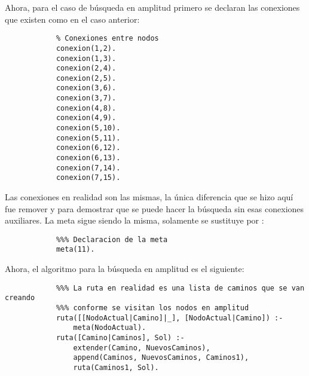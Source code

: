 \begin{solution}
        Ahora, para el caso de búsqueda en amplitud primero se declaran las conexiones que existen como en el caso anterior:
        \begin{verbatim}
            % Conexiones entre nodos
            conexion(1,2).
            conexion(1,3).
            conexion(2,4).
            conexion(2,5).
            conexion(3,6).
            conexion(3,7).
            conexion(4,8).
            conexion(4,9).
            conexion(5,10).
            conexion(5,11).
            conexion(6,12).
            conexion(6,13).
            conexion(7,14).
            conexion(7,15).
        \end{verbatim}

        Las conexiones en realidad son las mismas, la única diferencia que se hizo aquí fue remover  y  para demostrar que se puede hacer la búsqueda sin esas conexiones auxiliares. La meta sigue siendo la misma, solamente se sustituye  por :
        \begin{verbatim}
            %%% Declaracion de la meta
            meta(11).
        \end{verbatim}

        Ahora, el algoritmo para la búsqueda en amplitud es el siguiente:
        \begin{verbatim}
            %%% La ruta en realidad es una lista de caminos que se van creando
            %%% conforme se visitan los nodos en amplitud
            ruta([[NodoActual|Camino]|_], [NodoActual|Camino]) :-
                meta(NodoActual).
            ruta([Camino|Caminos], Sol) :-
                extender(Camino, NuevosCaminos),
                append(Caminos, NuevosCaminos, Caminos1),
                ruta(Caminos1, Sol).


\end{verbatim}
\end{solution}
